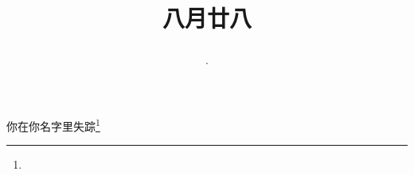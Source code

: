 \title{\date[d=30,m=9,y=2024][year:cn-y,年,month:cn,day:cn,日,·,weekday]·八月廿八 }
你在你名字里失踪\footnote{ }


